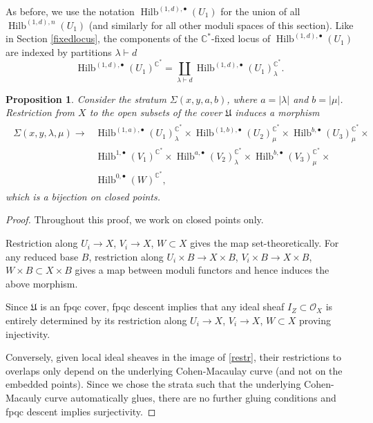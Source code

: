 \documentclass{amsart}
\newtheorem{proposition}[theorem]{Proposition}
\theoremstyle{definition}
\newcommand{\CC} {\mathbb{C}}          %
\renewcommand{\O}{\mathcal{O}}
\newcommand{\Hilb}{\operatorname{Hilb}}
\begin{document}
As before, we use the notation $\Hilb^{(1,d),\bullet}(U_1)$ for the union of all $\Hilb^{(1,d),n}(U_1)$ (and similarly for all other moduli spaces of this section). Like in Section \ref{fixedlocus}, the components of the $\CC^*$-fixed locus of $\Hilb^{(1,d),\bullet}(U_1)$ are indexed by partitions $\lambda \vdash d$
$$
\Hilb^{(1,d),\bullet}(U_1)^{\CC^*} = \coprod_{\lambda \vdash d} \Hilb^{(1,d),\bullet}(U_1)_{\lambda}^{\CC^*}.
$$

\begin{proposition} \label{bij}
Consider the stratum $\Sigma(x,y,a,b)$, where $a = |\lambda|$ and $b = |\mu|$. Restriction from $X$ to the open subsets of the cover $\mathfrak{U}$ induces a morphism
\begin{align}
\begin{split} \label{restr}
\Sigma(x,y,\lambda,\mu) \longrightarrow &\Hilb^{(1,a),\bullet}(U_1)_{\lambda}^{\CC^*} \times \Hilb^{(1,b),\bullet}(U_2)_{\mu}^{\CC^*} \times \Hilb^{b,\bullet}(U_3)_{\mu}^{\CC^*} \times \\
&\Hilb^{1,\bullet}(V_1)^{\CC^*} \times \Hilb^{a,\bullet}(V_2)_{\lambda}^{\CC^*} \times \Hilb^{b,\bullet}(V_3)_{\mu}^{\CC^*} \times \\
&\Hilb^{0,\bullet}(W)^{\CC^*},
\end{split}
\end{align}
which is a bijection on closed points.
\end{proposition}
\begin{proof}
Throughout this proof, we work on closed points only.

Restriction along $U_i \rightarrow X$, $V_i \longrightarrow X$, $W \subset X$ gives the map set-theoretically. For any reduced base $B$, restriction along $U_i \times B \rightarrow X \times B$, $V_i \times B \longrightarrow X \times B$, $W \times B \subset X \times B$ gives a map between moduli functors and hence induces the above morphism.

Since $\mathfrak{U}$ is an fpqc cover, fpqc descent implies that any ideal sheaf $I_Z \subset \O_X$ is entirely determined by its restriction along $U_i \rightarrow X$, $V_i \longrightarrow X$, $W \subset X$ proving injectivity.

Conversely, given local ideal sheaves in the image of \eqref{restr}, their restrictions to overlaps only depend on the underlying Cohen-Macaulay curve (and not on the embedded points). Since we chose the strata such that the underlying Cohen-Macauly curve automatically glues, there are no further gluing conditions and fpqc descent implies surjectivity.
\end{proof}
   
\end{document}
